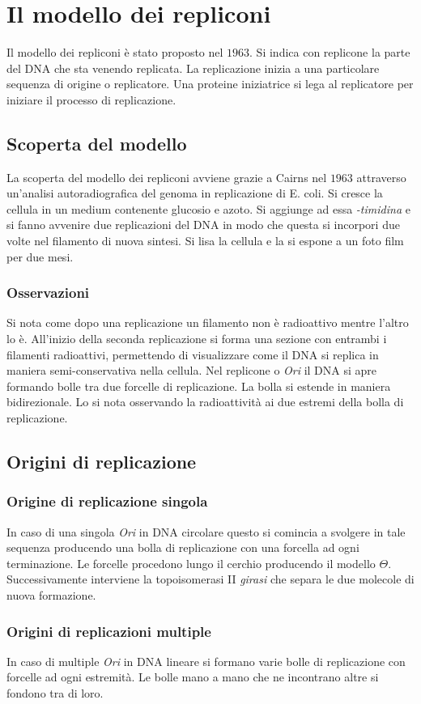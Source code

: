 \section{Il modello dei repliconi}
Il modello dei repliconi \`e stato proposto nel $1963$. Si indica con replicone la parte del DNA che sta venendo replicata. La replicazione inizia a una particolare sequenza di origine
o replicatore. Una proteine iniziatrice si lega al replicatore per iniziare il processo di replicazione. 
\subsection{Scoperta del modello}
La scoperta del modello dei repliconi avviene grazie a Cairns nel $1963$ attraverso un'analisi autoradiografica del genoma in replicazione di E. coli. Si cresce la cellula in un medium
contenente glucosio e azoto. Si aggiunge ad essa \emph{\ce{[3H]}-timidina} e si fanno avvenire due replicazioni del DNA in modo che questa si incorpori due volte nel filamento di 
nuova sintesi. Si lisa la cellula e la si espone a un foto film per due mesi. 
\subsubsection{Osservazioni}
Si nota come dopo una replicazione un filamento non \`e radioattivo mentre l'altro lo \`e. All'inizio della seconda replicazione si forma una sezione con entrambi i filamenti 
radioattivi, permettendo di visualizzare come il DNA si replica in maniera semi-conservativa nella cellula. Nel replicone o \emph{Ori} il DNA si apre formando bolle tra due 
forcelle di replicazione. La bolla si estende in maniera bidirezionale.	Lo si nota osservando la radioattivit\`a ai due estremi della bolla di replicazione. 
\subsection{Origini di replicazione}
\subsubsection{Origine di replicazione singola}
In caso di una singola \emph{Ori} in DNA circolare questo si comincia a svolgere in tale sequenza producendo una bolla di replicazione con una forcella ad ogni terminazione. Le forcelle
procedono lungo il cerchio producendo il modello $\Theta$. Successivamente interviene la topoisomerasi II \emph{girasi} che separa le due molecole di nuova formazione.
\subsubsection{Origini di replicazioni multiple}
In caso di multiple \emph{Ori} in DNA lineare si formano varie bolle di replicazione con forcelle ad ogni estremit\`a. Le bolle mano a mano che ne incontrano altre si fondono tra di 
loro.
